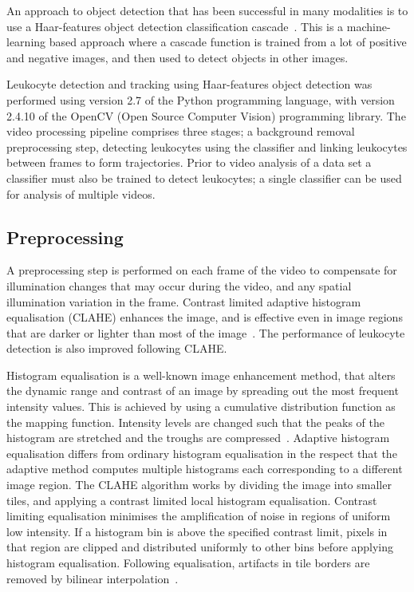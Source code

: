 An approach to object detection that has been successful in many modalities is to use a Haar-features object detection classification cascade~\cite{Lienhart2002}. This is a machine-learning based approach where a cascade function is trained from a lot of positive and negative images, and  then used to detect objects in other images. 

Leukocyte detection and tracking using Haar-features object detection was performed using version 2.7 of the Python programming language, with version 2.4.10 of the OpenCV (Open Source Computer Vision) programming library. The video processing pipeline comprises three stages; a background removal preprocessing step, detecting leukocytes using the classifier and linking leukocytes between frames to form trajectories. Prior to video analysis of a data set a classifier must also be trained to detect leukocytes; a single classifier can be used for analysis of multiple videos.

\subsection{Preprocessing}
\label{leukocytes:processing:preprocessing}
A preprocessing step is performed on each frame of the video to compensate for illumination changes that may occur during the video, and any spatial illumination variation in the frame. Contrast limited adaptive histogram equalisation (CLAHE) enhances the image, and is effective even in image regions that are darker or lighter than most of the image~\cite{Ketcham1974}. The performance of leukocyte detection is also improved following CLAHE.

Histogram equalisation is a well-known image enhancement method, that alters the dynamic range and contrast of an image by spreading out the most frequent intensity values. This is achieved by using a cumulative distribution function as the mapping function. Intensity levels are changed such that the peaks of the histogram are stretched and the troughs are compressed~\cite{Sasi2013}. Adaptive histogram equalisation differs from ordinary histogram equalisation in the respect that the adaptive method computes multiple histograms each corresponding to a different image region. The CLAHE algorithm works by dividing the image into smaller tiles, and applying a contrast limited local histogram equalisation. Contrast limiting equalisation minimises the amplification of noise in regions of uniform low intensity. If a histogram bin is above the specified contrast limit, pixels in that region are clipped and distributed uniformly to other bins before applying histogram equalisation. Following equalisation, artifacts in tile borders are removed by bilinear interpolation~\cite{Hummel1977}.

